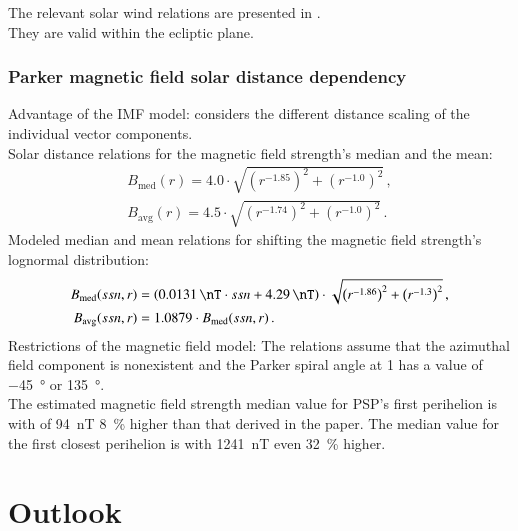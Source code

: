 The relevant solar wind relations are presented in \citet[p.~10]{Venzmer2018}.\\
They are valid within the ecliptic plane.\\


\subsubsection*{Parker magnetic field solar distance dependency}
Advantage of the IMF model: considers the different distance scaling of the individual vector components.\\

Solar distance relations for the magnetic field strength's median and the mean:
\begin{align}
	B_\text{med}(r) = 4.0 \cdot \sqrt{\left(r^{-1.85}\right)^2 + \left(r^{-1.0}\right)^2}	\,,\\
	B_\text{avg}(r) = 4.5 \cdot \sqrt{\left(r^{-1.74}\right)^2 + \left(r^{-1.0}\right)^2}	\,.
\end{align}
Modeled median and mean relations for shifting the magnetic field strength's lognormal distribution:
\begin{align}
	B_\text{med}(ssn,r) &= \left(\SI{0.0131}{\nT} \cdot ssn + \SI{4.29}{\nT}\right) \cdot \sqrt{\left(r^{-1.86}\right)^2 + \left(r^{-1.3}\right)^2}	\,,\\
	B_\text{avg}(ssn,r) &= 1.0879 \cdot B_\text{med}(ssn,r)	\,.
\end{align}
Restrictions of the magnetic field model: The relations assume that the azimuthal field component is nonexistent and the Parker spiral angle at \SI{1}{\au} has a value of \SI{-45}{\degree} or \SI{135}{\degree}.\\

The estimated magnetic field strength median value for PSP's first perihelion is with of \SI{94}{\nano\tesla} \SI{8}{\%} higher than that derived in the paper. The median value for the first closest perihelion is with \SI{1241}{\nano\tesla} even \SI{32}{\%} higher.\\


\section{Outlook}



